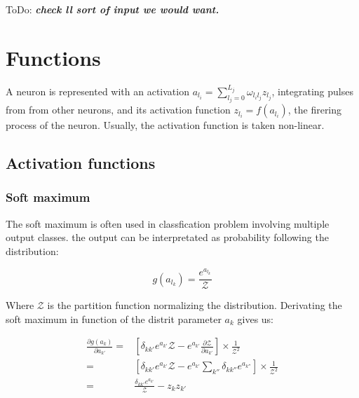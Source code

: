 \documentclass[final, paper=letter,5p,times,twocolumn]{elsarticle}
\newcommand{\ToDo}[1]{ToDo: \textbf{\textit{#1}}}
\begin{document}
\ToDo{check ll sort of input we would want.} \\

\section{Functions}

A neuron is represented with an activation $a_{l_{i}} = \sum_{l_{j} = 0}^{L_{j}} \omega_{l_{i}l_{j}} z_{l_{j}}$, integrating pulses from from other neurons, and its activation function $z_{l_{i}} = f(a_{l_{i}})$, the firering process of the neuron. Usually, the activation function is taken non-linear.

\subsection{Activation functions}

\subsubsection{Soft maximum}
\label{soft_max_sec}

The soft maximum is often used in classfication problem involving multiple output classes. the output can be interpretated as probability following the distribution:

\begin{equation}
  g(a_{l_{k}}) = \frac{e^{a_{l_{k}}}}{\mathcal{Z}}
  \label{soft_max}
\end{equation}

Where $\mathcal{Z}$ is the partition function normalizing the distribution. Derivating the soft maximum in function of the distrit parameter $a_{k}$ gives us:

  \begin{equation*}
    \begin{split}
      \frac{\partial g(a_{k})}{\partial a_{k'}} = & \left \lbrack \delta_{kk'} e^{a_{k'}} \mathcal{Z} - e^{a_{k'}}\frac{\partial \mathcal{Z}}{\partial a_{k'}} \right \rbrack \times \frac{1}{\mathcal{Z}^{2}}\\
      = & \left \lbrack \delta_{kk'} e^{a_{k'}} \mathcal{Z} - e^{a_{k'}} \sum_{k''} \delta_{kk''} e^{a_{k''}}  \right \rbrack \times \frac{1}{\mathcal{Z}^{2}}\\
      = & \frac{\delta_{kk'} e^{a_{k'}}}{\mathcal{Z}} - z_{k}z_{k'}\\
    \end{split}
\end{equation*}
\end{document}
